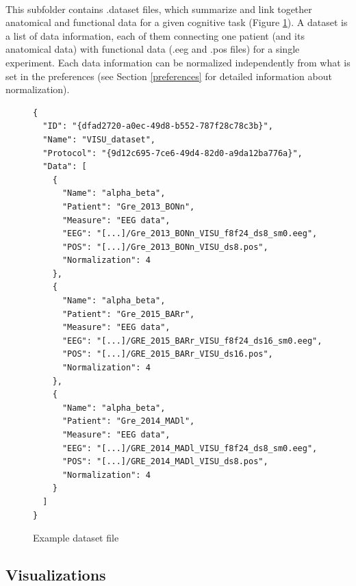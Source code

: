 \documentclass[a4paper]{article}
\begin{document}
\paragraph{} This subfolder contains .dataset files, which summarize and link together anatomical and functional data for a given cognitive task (Figure \ref{datasetFile}).
A dataset is a list of data information, each of them connecting one patient (and its anatomical data) with functional data (.eeg and .pos files) for a single experiment. Each data information can be normalized independently from what is set in the preferences (see Section \ref{preferences} for detailed information about normalization).
\begin{figure}[H]
\begin{lstlisting}
{
  "ID": "{dfad2720-a0ec-49d8-b552-787f28c78c3b}",
  "Name": "VISU_dataset",
  "Protocol": "{9d12c695-7ce6-49d4-82d0-a9da12ba776a}",
  "Data": [
    {
      "Name": "alpha_beta",
      "Patient": "Gre_2013_BONn",
      "Measure": "EEG data",
      "EEG": "[...]/Gre_2013_BONn_VISU_f8f24_ds8_sm0.eeg",
      "POS": "[...]/Gre_2013_BONn_VISU_ds8.pos",
      "Normalization": 4
    },
    {
      "Name": "alpha_beta",
      "Patient": "Gre_2015_BARr",
      "Measure": "EEG data",
      "EEG": "[...]/GRE_2015_BARr_VISU_f8f24_ds16_sm0.eeg",
      "POS": "[...]/GRE_2015_BARr_VISU_ds16.pos",
      "Normalization": 4
    },
    {
      "Name": "alpha_beta",
      "Patient": "Gre_2014_MADl",
      "Measure": "EEG data",
      "EEG": "[...]/GRE_2014_MADl_VISU_f8f24_ds8_sm0.eeg",
      "POS": "[...]/GRE_2014_MADl_VISU_ds8.pos",
      "Normalization": 4
    }
  ]
}
\end{lstlisting}
\caption{\label{datasetFile}Example dataset file}
\end{figure}
\subsection{Visualizations}
\end{document}
